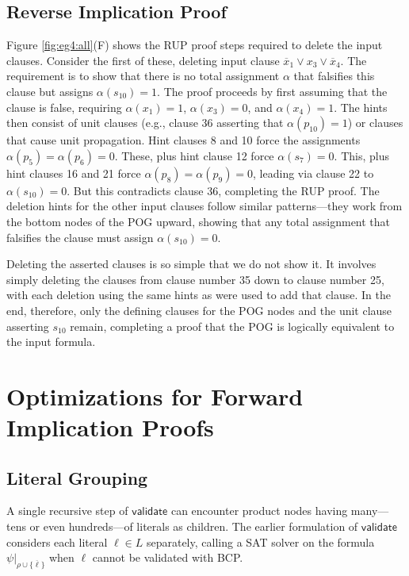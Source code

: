 \documentclass[letterpaper,USenglish,cleveref, autoref, thm-restate]{lipics-v2021}
\newcommand{\obar}[1]{\overline{#1}}
\newcommand{\lit}{\ell}
\newcommand{\assign}{\alpha}
\newcommand{\passign}{\rho}
\newcommand{\validate}{\textsf{validate}}
\newcommand{\simplify}[2]{#1|_{#2}}
\begin{document}
\subsection{Reverse Implication Proof}

Figure \ref{fig:eg4:all}(F) shows the RUP proof steps required to
delete the input clauses.  Consider the first of these, deleting
input clause $\obar{x}_1 \lor x_3 \lor \obar{x}_4$.  The requirement is to show
that there is no total assignment $\assign$ that falsifies this clause but assigns $\assign(s_{10}) = 1$.
The proof proceeds by first assuming that the clause is false, requiring
$\assign(x_1) = 1$, $\assign(x_3) = 0$, and $\assign(x_4) = 1$.  The hints then consist of unit
clauses (e.g., clause 36 asserting that $\alpha(p_{10}) = 1$) or
clauses that cause unit propagation.  Hint clauses 8 and 10 force the
assignments $\assign(p_5) = \assign(p_6) = 0$.  These, plus hint clause 12 force
$\assign(s_7) = 0$.  This, plus hint clauses 16 and 21 force $\assign(p_8) = \assign(p_9) = 0$, leading
via clause 22 to $\assign(s_{10}) = 0$.  But this contradicts clause 36,
completing the RUP proof.  The deletion hints for the other input
clauses follow similar patterns---they work from the bottom nodes of
the POG upward, showing that any total assignment that falsifies the clause
must assign $\assign(s_{10}) = 0$.

Deleting the asserted clauses is so simple that we do not show it.  It
involves simply deleting the clauses from clause number 35 down to
clause number 25, with each deletion using the same hints as were used
to add that clause.  In the end, therefore, only the defining clauses
for the POG nodes and the unit clause asserting $s_{10}$ remain,
completing a proof that the POG is logically equivalent to the input
formula.


\section{Optimizations for Forward Implication Proofs}
\label{app:optimizations}

\subsection{Literal Grouping}

A single recursive step of $\validate$ can encounter product nodes
having many---tens or even hundreds---of literals as children.  The earlier formulation of $\validate$
considers each literal $\lit \in L$ separately,
calling a SAT solver
on the formula  $\simplify{\psi}{\passign \cup \{\obar{\lit}\}}$ when $\lit$ cannot be validated with BCP\@.
\end{document}
